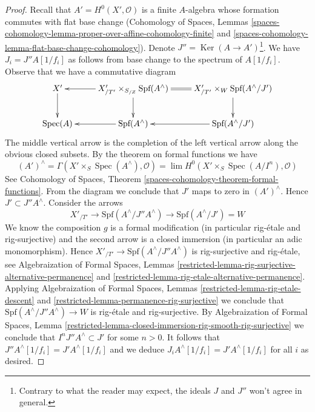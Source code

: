 \documentclass[10pt,a4paper]{amsart}
\theoremstyle{plain}
\theoremstyle{definition}
\theoremstyle{remark}
\numberwithin{equation}{subsection}
\def\lim{\mathop{\mathrm{lim}}\nolimits}
\def\Spec{\mathop{\mathrm{Spec}}}
\def\Ker{\mathop{\mathrm{Ker}}}
\begin{document}
\begin{proof}
\medskip\noindent
Recall that $A' = H^0(X', \mathcal{O})$ is a finite $A$-algebra
whose formation commutes with flat base change
(Cohomology of Spaces, Lemmas
\ref{spaces-cohomology-lemma-proper-over-affine-cohomology-finite} and
\ref{spaces-cohomology-lemma-flat-base-change-cohomology}). Denote
$J'' = \Ker(A \to A')$\footnote{Contrary to what the reader
may expect, the ideals $J$ and $J''$ won't agree in general.}.
We have $J_i = J''A[1/f_i]$ as follows
from base change to the spectrum of $A[1/f_i]$.
Observe that we have a commutative diagram
$$
\xymatrix{
X' \ar[d] &
X'_{/T'} \times_{S_{/Z}} \text{Spf}(A^\wedge) \ar[l] \ar[d] &
X'_{/T'} \times_W \text{Spf}(A^\wedge/J') \ar@{=}[l] \ar[d] \\
\Spec(A) &
\text{Spf}(A^\wedge) \ar[l] &
\text{Spf}(A^\wedge/J') \ar[l]
}
$$
The middle vertical arrow is the completion of the left vertical
arrow along the obvious closed subsets. By the theorem on formal
functions we have
$$
(A')^\wedge = \Gamma(X' \times_S \Spec(A^\wedge), \mathcal{O}) =
\lim H^0(X' \times_S \Spec(A/I^n), \mathcal{O})
$$
See Cohomology of Spaces, Theorem
\ref{spaces-cohomology-theorem-formal-functions}.
From the diagram we conclude that $J'$ maps to zero in $(A')^\wedge$.
Hence $J' \subset J'' A^\wedge$. Consider the arrows
$$
X'_{/T'} \to
\text{Spf}(A^\wedge/J''A^\wedge) \to
\text{Spf}(A^\wedge/J') = W
$$
We know the composition $g$ is a formal modification
(in particular rig-\'etale and rig-surjective) and the second
arrow is a closed immersion (in particular an adic monomorphism).
Hence $X'_{/T'} \to \text{Spf}(A^\wedge/J''A^\wedge)$ is
rig-surjective and rig-\'etale, see
Algebraization of Formal Spaces, Lemmas
\ref{restricted-lemma-rig-surjective-alternative-permanence} and
\ref{restricted-lemma-rig-etale-alternative-permanence}.
Applying Algebraization of Formal Spaces, Lemmas
\ref{restricted-lemma-rig-etale-descent} and
\ref{restricted-lemma-permanence-rig-surjective}
we conclude that $\text{Spf}(A^\wedge/J''A^\wedge) \to W$
is rig-\'etale and rig-surjective.
By Algebraization of Formal Spaces, Lemma
\ref{restricted-lemma-closed-immersion-rig-smooth-rig-surjective}
we conclude that $I^n J'' A^\wedge \subset J'$ for some $n > 0$.
It follows that $J'' A^\wedge[1/f_i] = J' A^\wedge[1/f_i]$ and
we deduce $J_i A^\wedge[1/f_i] = J' A^\wedge[1/f_i]$ for all
$i$ as desired.
\end{proof}
\end{document}
